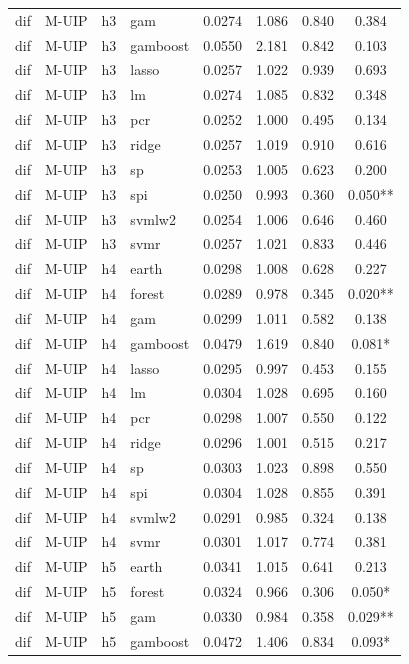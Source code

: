 \begin{ThreePartTable}
\begin{longtable}[t]{llclcccc}
dif & M-UIP & h3 & gam & 0.0274 & 1.086 & 0.840 & 0.384\\
dif & M-UIP & h3 & gamboost & 0.0550 & 2.181 & 0.842 & 0.103\\
dif & M-UIP & h3 & lasso & 0.0257 & 1.022 & 0.939 & 0.693\\
dif & M-UIP & h3 & lm & 0.0274 & 1.085 & 0.832 & 0.348\\
dif & M-UIP & h3 & pcr & 0.0252 & 1.000 & 0.495 & 0.134\\
dif & M-UIP & h3 & ridge & 0.0257 & 1.019 & 0.910 & 0.616\\
dif & M-UIP & h3 & sp & 0.0253 & 1.005 & 0.623 & 0.200\\
dif & M-UIP & h3 & spi & 0.0250 & 0.993 & 0.360 & 0.050**\\
dif & M-UIP & h3 & svmlw2 & 0.0254 & 1.006 & 0.646 & 0.460\\
dif & M-UIP & h3 & svmr & 0.0257 & 1.021 & 0.833 & 0.446\\
\addlinespace
dif & M-UIP & h4 & earth & 0.0298 & 1.008 & 0.628 & 0.227\\
dif & M-UIP & h4 & forest & 0.0289 & 0.978 & 0.345 & 0.020**\\
dif & M-UIP & h4 & gam & 0.0299 & 1.011 & 0.582 & 0.138\\
dif & M-UIP & h4 & gamboost & 0.0479 & 1.619 & 0.840 & 0.081*\\
dif & M-UIP & h4 & lasso & 0.0295 & 0.997 & 0.453 & 0.155\\
dif & M-UIP & h4 & lm & 0.0304 & 1.028 & 0.695 & 0.160\\
dif & M-UIP & h4 & pcr & 0.0298 & 1.007 & 0.550 & 0.122\\
dif & M-UIP & h4 & ridge & 0.0296 & 1.001 & 0.515 & 0.217\\
dif & M-UIP & h4 & sp & 0.0303 & 1.023 & 0.898 & 0.550\\
dif & M-UIP & h4 & spi & 0.0304 & 1.028 & 0.855 & 0.391\\
dif & M-UIP & h4 & svmlw2 & 0.0291 & 0.985 & 0.324 & 0.138\\
dif & M-UIP & h4 & svmr & 0.0301 & 1.017 & 0.774 & 0.381\\
\addlinespace
dif & M-UIP & h5 & earth & 0.0341 & 1.015 & 0.641 & 0.213\\
dif & M-UIP & h5 & forest & 0.0324 & 0.966 & 0.306 & 0.050*\\
dif & M-UIP & h5 & gam & 0.0330 & 0.984 & 0.358 & 0.029**\\
dif & M-UIP & h5 & gamboost & 0.0472 & 1.406 & 0.834 & 0.093*\\

\end{longtable}
\end{ThreePartTable}
